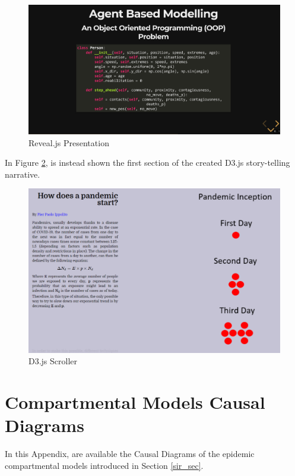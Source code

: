 \begin{appendices}
\begin{figure}[ht!]%
    \centering
    \includegraphics[width=1\linewidth]{latex/images/demo1.pdf}
    \caption{Reveal.js Presentation}
    \label{revealjs_ex}
\end{figure}
\vspace{-0.3cm}
In Figure \ref{d3js_ex}, is instead shown the first section of the created D3.js story-telling narrative.

\begin{figure}[ht!]%
    \centering
    \includegraphics[width=0.8\linewidth]{latex/images/d3js_demo.pdf}
    \caption{D3.js Scroller}
    \label{d3js_ex}
\end{figure}


\section{Compartmental Models Causal Diagrams}
\label{causal_comp}

In this Appendix, are available the Causal Diagrams of the epidemic compartmental models introduced in Section \ref{sir_sec}.


\end{appendices}
